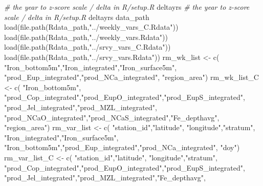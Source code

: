 \documentclass[
]{article}
\newenvironment{Shaded}{\begin{snugshade}}{\end{snugshade}}
\newcommand{\CommentTok}[1]{\textcolor[rgb]{0.56,0.35,0.01}{\textit{#1}}}
\newcommand{\FunctionTok}[1]{\textcolor[rgb]{0.00,0.00,0.00}{#1}}
\newcommand{\NormalTok}[1]{#1}
\newcommand{\OtherTok}[1]{\textcolor[rgb]{0.56,0.35,0.01}{#1}}
\newcommand{\StringTok}[1]{\textcolor[rgb]{0.31,0.60,0.02}{#1}}
\begin{document}
\begin{Shaded}
\begin{Highlighting}[]
    \CommentTok{\# the year to z{-}score scale / delta in R/setup.R}
\NormalTok{    deltayrs }
    \CommentTok{\# the year to z{-}score scale / delta in R/setup.R}
\NormalTok{    deltayrs }
\NormalTok{    data\_path}
    \FunctionTok{load}\NormalTok{(}\FunctionTok{file.path}\NormalTok{(Rdata\_path,}\StringTok{"../weekly\_vars\_C.Rdata"}\NormalTok{))}
    \FunctionTok{load}\NormalTok{(}\FunctionTok{file.path}\NormalTok{(Rdata\_path,}\StringTok{"../weekly\_vars.Rdata"}\NormalTok{))}
    \FunctionTok{load}\NormalTok{(}\FunctionTok{file.path}\NormalTok{(Rdata\_path,}\StringTok{"../srvy\_vars\_C.Rdata"}\NormalTok{))}
    \FunctionTok{load}\NormalTok{(}\FunctionTok{file.path}\NormalTok{(Rdata\_path,}\StringTok{"../srvy\_vars.Rdata"}\NormalTok{))}
\NormalTok{  rm\_wk\_list }\OtherTok{\textless{}{-}} \FunctionTok{c}\NormalTok{(}
    \StringTok{"Iron\_bottom5m"}\NormalTok{,}\StringTok{"Iron\_integrated"}\NormalTok{,}\StringTok{"Iron\_surface5m"}\NormalTok{,}
    \StringTok{"prod\_Eup\_integrated"}\NormalTok{,}\StringTok{"prod\_NCa\_integrated"}\NormalTok{,}
    \StringTok{"region\_area"}\NormalTok{)}
\NormalTok{  rm\_wk\_list\_C }\OtherTok{\textless{}{-}} \FunctionTok{c}\NormalTok{( }\StringTok{"Iron\_bottom5m"}\NormalTok{,}
    \StringTok{"prod\_Cop\_integrated"}\NormalTok{,}\StringTok{"prod\_EupO\_integrated"}\NormalTok{,}\StringTok{"prod\_EupS\_integrated"}\NormalTok{,}
    \StringTok{"prod\_Jel\_integrated"}\NormalTok{,}\StringTok{"prod\_MZL\_integrated"}\NormalTok{,}
    \StringTok{"prod\_NCaO\_integrated"}\NormalTok{,}\StringTok{"prod\_NCaS\_integrated"}\NormalTok{,}\StringTok{"Fe\_depthavg"}\NormalTok{,}
    \StringTok{"region\_area"}\NormalTok{)}
\NormalTok{  rm\_var\_list }\OtherTok{\textless{}{-}} \FunctionTok{c}\NormalTok{(}
    \StringTok{"station\_id"}\NormalTok{,}\StringTok{"latitude"}\NormalTok{,}
    \StringTok{"longitude"}\NormalTok{,}\StringTok{"stratum"}\NormalTok{,}
     \StringTok{"Iron\_integrated"}\NormalTok{,}\StringTok{"Iron\_surface5m"}\NormalTok{,}
     \StringTok{"Iron\_bottom5m"}\NormalTok{,}\StringTok{"prod\_Eup\_integrated"}\NormalTok{,}\StringTok{"prod\_NCa\_integrated"}\NormalTok{,}
    \StringTok{"doy"}\NormalTok{)}
\NormalTok{  rm\_var\_list\_C }\OtherTok{\textless{}{-}} \FunctionTok{c}\NormalTok{(}
    \StringTok{"station\_id"}\NormalTok{,}\StringTok{"latitude"}\NormalTok{,}
    \StringTok{"longitude"}\NormalTok{,}\StringTok{"stratum"}\NormalTok{,}
     \StringTok{"prod\_Cop\_integrated"}\NormalTok{,}\StringTok{"prod\_EupO\_integrated"}\NormalTok{,}\StringTok{"prod\_EupS\_integrated"}\NormalTok{,}
    \StringTok{"prod\_Jel\_integrated"}\NormalTok{,}\StringTok{"prod\_MZL\_integrated"}\NormalTok{,}\StringTok{"Fe\_depthavg"}\NormalTok{,}

\end{Highlighting}
\end{Shaded}
\end{document}
